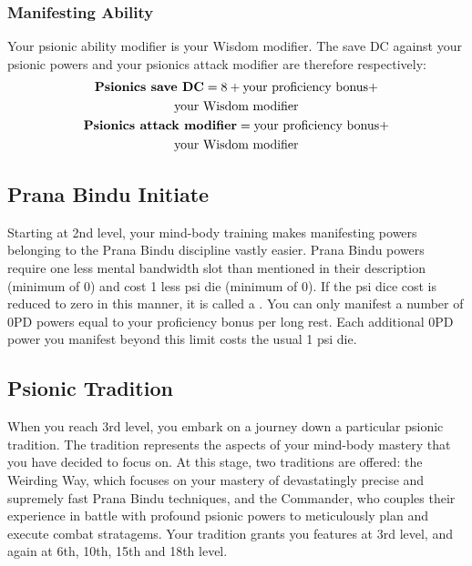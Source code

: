 \subsubsection{Manifesting Ability}
Your psionic ability modifier is your Wisdom modifier.
The save DC against your psionic powers and your
psionics attack modifier are therefore respectively:
\small\begin{equation*}
    \begin{gathered}
        \text{\textbf{Psionics save DC}}
            = 8 + \text{your proficiency bonus} + \\
                  \text{your Wisdom modifier} \\
        \text{\textbf{Psionics attack modifier}}
            = \text{your proficiency bonus} + \\
              \text{your Wisdom modifier}
    \end{gathered}
\end{equation*}\normalsize

\subsection{Prana Bindu Initiate}
Starting at 2nd level,
your mind-body training makes manifesting powers
belonging to the Prana Bindu discipline
vastly easier.
Prana Bindu powers require one less mental bandwidth slot
than mentioned in their description (minimum of 0)
and cost 1 less psi die (minimum of 0).
If the psi dice cost is reduced to zero in this manner,
it is called a .
You can only manifest a number of 0PD powers
equal to your proficiency bonus per long rest.
Each additional 0PD power you manifest
beyond this limit costs the usual 1 psi die.

\subsection{Psionic Tradition}
When you reach 3rd level,
you embark on a journey down a particular
psionic tradition.
The tradition represents the aspects of
your mind-body mastery that you have decided
to focus on.
At this stage, two traditions are offered:
the Weirding Way, which focuses on your mastery
of devastatingly precise and supremely fast
Prana Bindu techniques,
and the Commander,
who couples their experience in battle
with profound psionic powers to meticulously
plan and execute combat stratagems.
Your tradition grants you features at 3rd level,
and again at 6th, 10th, 15th and 18th level.

